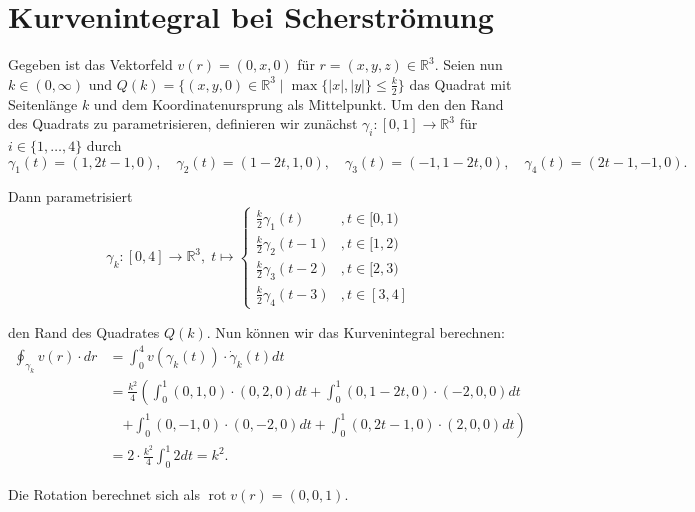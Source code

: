 \documentclass[11pt]{article}
\theoremstyle{plain}
\theoremstyle{definition}
\theoremstyle{remark}
\newcommand{\R}{\mathbb{R}}
\newcommand{\longto}{\longrightarrow}
\newcommand{\rot}{\operatorname{rot}}
\begin{document}


\section{Kurvenintegral bei Scherströmung}
Gegeben ist das Vektorfeld $v(r) = (0, x, 0)$ für $r = (x,y,z) \in \R^3$. Seien nun $k \in (0, \infty)$ und $Q(k) = \{ (x,y,0) \in \R^3 \mid \max \{ |x|,|y| \} \leq \frac{k}{2} \}$ das Quadrat mit Seitenlänge $k$ und dem Koordinatenursprung als Mittelpunkt. Um den den Rand des Quadrats zu parametrisieren, definieren wir zunächst $\gamma_i : [0,1] \longto \R^3$ für $i \in \{1,\dots, 4\}$ durch
\[ \gamma_1 (t) = (1, 2t-1, 0), \quad \gamma_2 (t) = (1-2t, 1, 0), \quad \gamma_3 (t) = (-1, 1-2t, 0), \quad \gamma_4 (t) = (2t-1, -1, 0). \]

Dann parametrisiert
\[ \gamma_k: [0,4] \longto \R^3,\; t \longmapsto \begin{cases}
\tfrac{k}{2}\gamma_1(t) &, t \in [0,1)\\
\tfrac{k}{2}\gamma_2(t-1) &, t \in [1,2)\\
\tfrac{k}{2}\gamma_3(t-2) &, t \in [2,3)\\
\tfrac{k}{2}\gamma_4(t-3) &, t \in [3,4]
\end{cases} \]

den Rand des Quadrates $Q(k)$. Nun können wir das Kurvenintegral berechnen:
\begin{align*}
\oint_{\gamma_k} v(r)\cdot dr &= \int_0^4 v(\gamma_k(t)) \cdot \dot \gamma_k (t) dt \\
&= \frac{k^2}{4} \left( \int_0^1 (0,1,0) \cdot (0,2,0) dt + \int_0^1 (0, 1-2t, 0) \cdot (-2,0,0) dt \right.\\
&\quad \left. + \int_0^1 (0,-1,0) \cdot (0,-2,0) dt + \int_0^1 (0, 2t-1, 0) \cdot (2,0,0) dt \right)\\
&= 2\cdot\frac{k^2}{4} \int_0^1 2 dt = k^2.
\end{align*}

Die Rotation berechnet sich als $\rot v(r) = (0,0,1)$.
\end{document}
